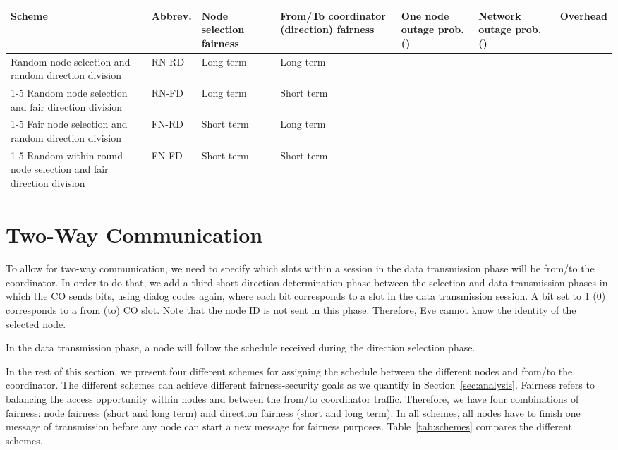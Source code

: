 \documentclass[10pt,letterpaper,conference]{IEEEtran}
\begin{document}
\begin{table*}[!t]
\centering
\caption{Comparison between the different scheduling schemes.}
\begin{tabular}{|p{3cm}||l|p{2cm}|p{2cm}|p{2cm}|p{2cm}|l|}
\hline
Scheme  & Abbrev. & Node selection fairness & From/To coordinator (direction)
fairness& One node outage prob. ()& Network outage prob.
()& Overhead\\
\hline
\hline
Random node selection and random direction division & RN-RD & Long term & Long
term &
 & \multirow{4}{*}{}  &
\multirow{4}{*}{}\\
\cline{1-5}
Random node selection and fair direction division & RN-FD & Long term & Short
term &
 & & \\
\cline{1-5}
Fair node selection and random direction division & FN-RD &
Short term & Long term &
 &  & \\
\cline{1-5}
Random within round node selection and fair direction division & FN-FD & Short
term & Short term &
 &  & \\
\hline
\end{tabular}
\label{tab:schemes}
\end{table*}

\section{Two-Way Communication}
\label{sec:extended}
To allow for two-way communication, we need to specify which slots within a
session in the data transmission phase will be from/to the coordinator. In order
to do that, we add a third short direction determination phase between the
selection and data transmission phases in which the CO sends  bits, using dialog codes again,
where each bit corresponds to a slot in the data transmission session. A bit set to 1 (0) corresponds to a from (to) CO slot. Note that the node ID is not sent in this phase. Therefore, Eve cannot
know the identity of the selected node.

In the data transmission phase, a node will follow the schedule received during
the direction selection phase.

In the rest of this section, we present four different schemes for assigning the
schedule between the different nodes and from/to the coordinator. The different
schemes can achieve different fairness-security goals as we quantify in
Section~\ref{sec:analysis}. Fairness refers to balancing the access opportunity
within nodes and between the from/to coordinator traffic. Therefore, we have
four combinations of fairness: node fairness (short and long term) and direction
fairness (short and long term). In all schemes, all nodes have to finish one
message of transmission before any node can start a new message for fairness purposes.
Table~\ref{tab:schemes} compares the different schemes.
\end{document}
